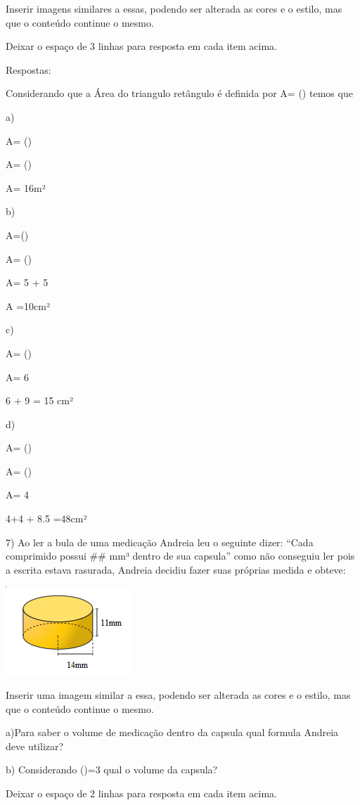 Inserir imagens similares a essas, podendo ser alterada as cores e o
estilo, mas que o conteúdo continue o mesmo.

Deixar o espaço de 3 linhas para resposta em cada item acima.

Respostas:

Considerando que a Área do triangulo retângulo é definida por A=
() temos que

a)

A= ()

A= ()

A= 16m²

b)

A=()

A= ()

A= 5 + 5

A =10cm²

c)

A= ()

A= 6

6 + 9 = 15 cm²

d)

A= ()

A= ()

A= 4

4+4 + 8.5 =48cm²

7) Ao ler a bula de uma medicação Andreia leu o seguinte dizer: ``Cada
comprimido possui \#\# mm³ dentro de sua capsula'' como não conseguiu
ler pois a escrita estava rasurada, Andreia decidiu fazer suas próprias
medida e obteve:

\includegraphics[width=1.88542in,height=1.3125in]{./imgSAEB_8_MAT/media/image50.png}

Inserir uma imagem similar a essa, podendo ser alterada as cores e o
estilo, mas que o conteúdo continue o mesmo.

a)Para saber o volume de medicação dentro da capsula qual formula
Andreia deve utilizar?

b) Considerando (\Pi)=3 qual o volume da capsula?

Deixar o espaço de 2 linhas para resposta em cada item acima.

